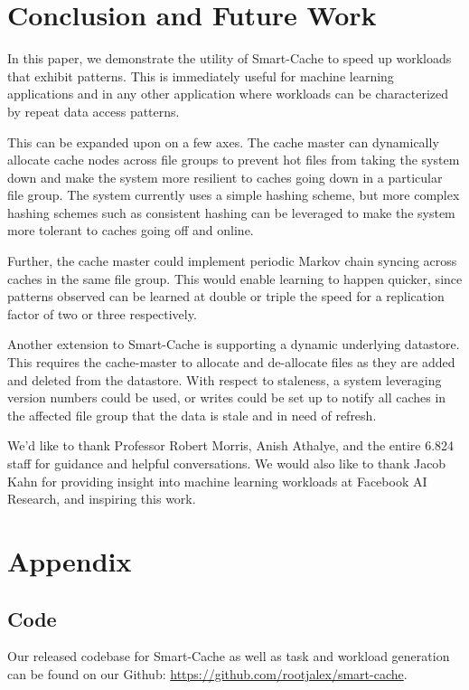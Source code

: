 \documentclass[sigconf]{acmart}
\begin{document}
\section{Conclusion and Future Work}
\label{sec:conclusion}
In this paper, we demonstrate the utility of Smart-Cache to speed up workloads that exhibit patterns. This is immediately useful for machine learning applications and in any other application where workloads can be characterized by repeat data access patterns. 

This can be expanded upon on a few axes. The cache master can dynamically allocate cache nodes across file groups to prevent hot files from taking the system down and make the system more resilient to caches going down in a particular file group. The system currently uses a simple hashing scheme, but more complex hashing schemes such as consistent hashing \cite{ConsistentHash} can be leveraged to make the system more tolerant to caches going off and online.

Further, the cache master could implement periodic Markov chain syncing across caches in the same file group. This would enable learning to happen quicker, since patterns observed can be learned at double or triple the speed for a replication factor of two or three respectively. 

Another extension to Smart-Cache is supporting a dynamic underlying datastore. This requires the cache-master to allocate and de-allocate files as they are added and deleted from the datastore. With respect to staleness, a system leveraging version numbers could be used, or writes could be set up to notify all caches in the affected file group that the data is stale and in need of refresh.




\begin{acks}
We'd like to thank Professor Robert Morris, Anish Athalye, and the entire 6.824 staff for guidance and helpful conversations. We would also like to thank Jacob Kahn for providing insight into machine learning workloads at Facebook AI Research, and inspiring this work.
\end{acks}


\appendix
\section{Appendix}
\label{sec:appendix}

\subsection{Code}
\label{sec:code}
Our released codebase for Smart-Cache as well as task and workload generation can be found on our Github: \url{https://github.com/rootjalex/smart-cache}.
\end{document}
